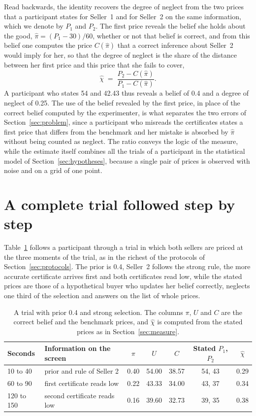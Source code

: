 \documentclass[11pt,a4paper]{article}
\begin{document}
Read backwards, the identity recovers the degree of neglect from the two prices that a participant states for Seller~1 and for Seller~2 on the same information, which we denote by $P_1$ and $P_2$. The first price reveals the belief she holds about the good, $\hat\pi=(P_1-30)/60$, whether or not that belief is correct, and from this belief one computes the price $C(\hat\pi)$ that a correct inference about Seller~2 would imply for her, so that the degree of neglect is the share of the distance between her first price and this price that she fails to cover,
\[
\hat\chi\;=\;\frac{P_2-C(\hat\pi)}{P_1-C(\hat\pi)} .
\]
A participant who states 54 and 42.43 thus reveals a belief of 0.4 and a degree of neglect of 0.25. The use of the belief revealed by the first price, in place of the correct belief computed by the experimenter, is what separates the two errors of Section~\ref{sec:problem}, since a participant who misreads the certificates states a first price that differs from the benchmark and her mistake is absorbed by $\hat\pi$ without being counted as neglect. The ratio conveys the logic of the measure, while the estimate itself combines all the trials of a participant in the statistical model of Section~\ref{sec:hypotheses}, because a single pair of prices is observed with noise and on a grid of one point.

\section{A complete trial followed step by step}\label{sec:example}

Table~\ref{tab:example} follows a participant through a trial in which both sellers are priced at the three moments of the trial, as in the richest of the protocols of Section~\ref{sec:protocols}. The prior is 0.4, Seller~2 follows the strong rule, the more accurate certificate arrives first and both certificates read low, while the stated prices are those of a hypothetical buyer who updates her belief correctly, neglects one third of the selection and answers on the list of whole prices.

\begin{table}[H]
\centering
\small
\begin{tabular}{@{}llccccc@{}}
\toprule
Seconds & Information on the screen & $\pi$ & $U$ & $C$ & Stated $P_1$, $P_2$ & $\hat\chi$\\
\midrule
10 to 40 & prior and rule of Seller 2 & 0.40 & 54.00 & 38.57 & 54, 43 & 0.29\\
60 to 90 & first certificate reads low & 0.22 & 43.33 & 34.00 & 43, 37 & 0.34\\
120 to 150 & second certificate reads low & 0.16 & 39.60 & 32.73 & 39, 35 & 0.38\\
\bottomrule
\end{tabular}
\caption{A trial with prior 0.4 and strong selection. The columns $\pi$, $U$ and $C$ are the correct belief and the benchmark prices, and $\hat\chi$ is computed from the stated prices as in Section~\ref{sec:measure}.}
\label{tab:example}
\end{table}
\end{document}

